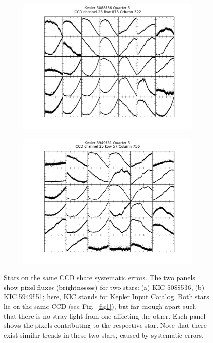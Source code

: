 \documentclass[12pt, preprint]{aastex}
\begin{document}
\begin{figure}[htb]
\centering
\begin{subfigure}[htb]{0.48\columnwidth}
\includegraphics[width=\columnwidth]{5088536-5}
\caption{}
\end{subfigure}%
\hfill
\begin{subfigure}[htb]{0.48\columnwidth}
\includegraphics[width=\columnwidth]{5949551-5}
\caption{}
\end{subfigure}
\caption{\label{ccd} Stars on the same CCD share systematic errors. 
The two panels show pixel fluxes (brightnesses) for two stars: (a) KIC 5088536, (b) KIC 5949551; 
here, KIC stands for Kepler Input Catalog. Both stars lie on the same CCD (see Fig.~\ref{fig1}), 
but far enough apart such that there is no stray light from one affecting the other. 
Each panel shows the pixels contributing to the respective star. 
Note that there exist similar trends in these two stars, caused by systematic errors. 
}
\end{figure}
\end{document}
